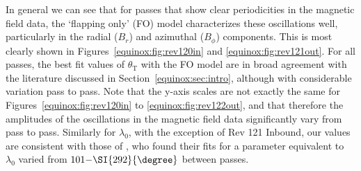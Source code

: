In general we can see that for passes that show clear periodicities in the magnetic field data, the `flapping only' (FO) model characterizes these oscillations well, particularly in the radial ($B_{r}$) and azimuthal ($B_\phi$) components. This is most clearly shown in Figures~\ref{equinox:fig:rev120in} and \ref{equinox:fig:rev121out}. For all passes, the best fit values of $\theta_\mathrm{T}$ with the FO model are in broad agreement with the literature discussed in Section~\ref{equinox:sec:intro}, although with considerable variation pass to pass. Note that the y-axis scales are not exactly the same for Figures~\ref{equinox:fig:rev120in} to \ref{equinox:fig:rev122out}, and that therefore the amplitudes of the oscillations in the magnetic field data significantly vary from pass to pass. Similarly for $\lambda_0$, with the exception of Rev 121 Inbound, our values are consistent with those of \citet{arridge2011}, who found their fits for a parameter equivalent to $\lambda_0$ varied from $101{\--}\SI{292}{\degree}$ between passes.

